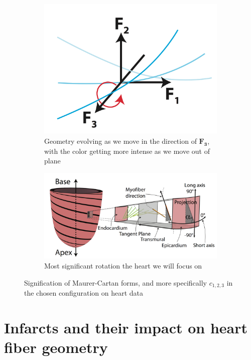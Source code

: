 \begin{figure}[h]
    \centering
    \begin{subfigure}[t]{.48\textwidth}
        \includegraphics[width=\textwidth]{figures/c123}
        \caption[b]{Geometry evolving as we move in the direction of $\mathbf{F_3}$, with the color getting more intense as we move out of plane}
        \label{fig:c123}
    \end{subfigure}
    \begin{subfigure}[t]{.48\textwidth}
        \includegraphics[width=\textwidth]{figures/helix_angle}
        \caption{Most significant rotation the heart we will focus on}
        \label{fig:helix_angle}
    \end{subfigure}
    \caption{Signification of Maurer-Cartan forms, and more specifically $c_{1,2,3}$ in the chosen configuration on heart data}
\end{figure}

\section{Infarcts and their impact on heart fiber geometry}

\cite{pmbpop2013quantification, mediamihaela}